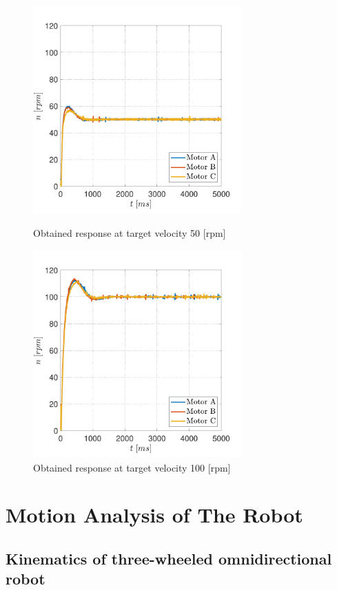 \documentclass[12pt,english]{article}
\begin{document}
\begin{figure}[htb!]
	\centering
	\centering
	\includegraphics[height=8cm]{figures/controlled_50_p_02_i_002}
	\caption{Obtained response at target velocity 50 [rpm]}
	\label{obtained_response_50_good}
	\endminipage\hfill
	\centering
	\includegraphics[height=8cm]{figures/controlled_100_p_02_i_002}
	\caption{Obtained response at target velocity 100 [rpm]}
	\label{obtained_response_100_good}
	\endminipage\hfill
\end{figure}
\newpage

\newpage
\section{Motion Analysis of The Robot}
\subsection{Kinematics of three-wheeled omnidirectional robot}
\end{document}
